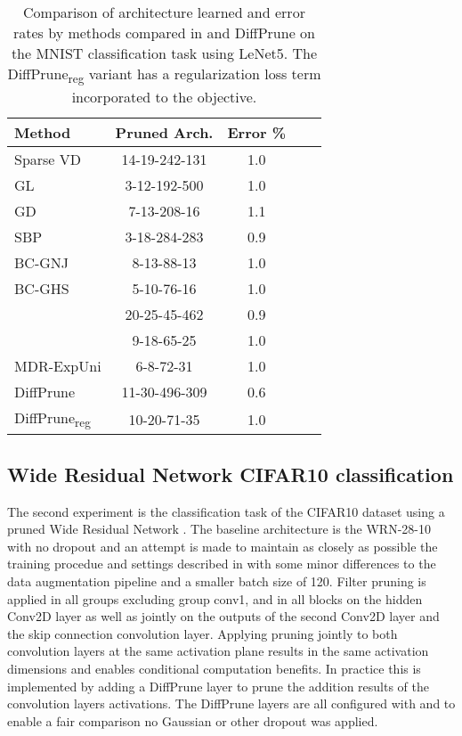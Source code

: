 \documentclass[final,1p,times]{elsarticle}
\begin{document}
\begin{table}[t]
\centering
\begin{tabular}{l c c c c } 
\toprule
Method & Pruned Arch. & Error \% \\ [0.5ex] 
\midrule
Sparse VD \cite{pmlr-v70-molchanov17a} & 14-19-242-131 & 1.0 \\
GL \cite{NIPS2016_6504} & 3-12-192-500 & 1.0 \\
GD \cite{srinivas2016generalized} & 7-13-208-16 & 1.1 \\
SBP \cite{NIPS2017_7254} & 3-18-284-283 & 0.9 \\
BC-GNJ \cite{NIPS2017_6921} & 8-13-88-13 & 1.0 \\
BC-GHS \cite{NIPS2017_6921} & 5-10-76-16 & 1.0 \\
 \cite{louizos2018learning} & 20-25-45-462 & 0.9 \\
 \cite{louizos2018learning} & 9-18-65-25 & 1.0 \\
MDR-ExpUni \cite{Huang_2020_CVPR_Workshops} & 6-8-72-31 & 1.0 \\
\midrule
DiffPrune & 11-30-496-309 & 0.6 \\ 
DiffPrune\textsubscript{reg} & 10-20-71-35 & 1.0 \\
\bottomrule
\end{tabular}
\caption{\label{tab:lenet5}Comparison of architecture learned and error rates by methods compared in \cite{louizos2018learning, Huang_2020_CVPR_Workshops} and DiffPrune on the MNIST classification task using LeNet5. The DiffPrune\textsubscript{reg} variant has a regularization loss term incorporated to the objective.} 
\end{table}

\subsection{Wide Residual Network CIFAR10 classification}

The second experiment is the classification task of the CIFAR10 dataset using a pruned Wide Residual Network \cite{BMVC2016_87}. The baseline architecture is the WRN-28-10 with no dropout and an attempt is made to maintain as closely as possible the training procedue and settings described in \cite{BMVC2016_87} with some minor differences to the data augmentation pipeline and a smaller batch size of 120. Filter pruning is applied in all groups excluding group conv1, and in all blocks on the hidden Conv2D layer as well as jointly on the outputs of the second Conv2D layer and the skip connection convolution layer. Applying pruning jointly to both convolution layers at the same activation plane results in the same activation dimensions and enables conditional computation benefits. In practice this is implemented by adding a DiffPrune layer to prune the addition results of the convolution layers activations. The DiffPrune layers are all configured with  and to enable a fair comparison no Gaussian or other dropout was applied. 
\end{document}
